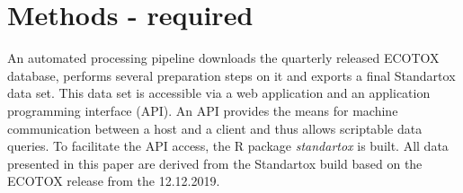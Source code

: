 \documentclass[journal,datadescriptor,accept,moreauthors,pdftex]{Definitions/mdpi}
\begin{document}
\section{Methods - required}
An automated processing pipeline downloads the quarterly released ECOTOX database, performs several preparation steps on it and exports a final Standartox data set. This data set is accessible via a web application and an application programming interface (API). An API provides the means for machine communication between a host and a client and thus allows scriptable data queries. To facilitate the API access, the R \citep{rcoreteam_language_2017} package \textit{standartox} is built. All data presented in this paper are derived from the Standartox build based on the ECOTOX release from the 12.12.2019.
\end{document}

